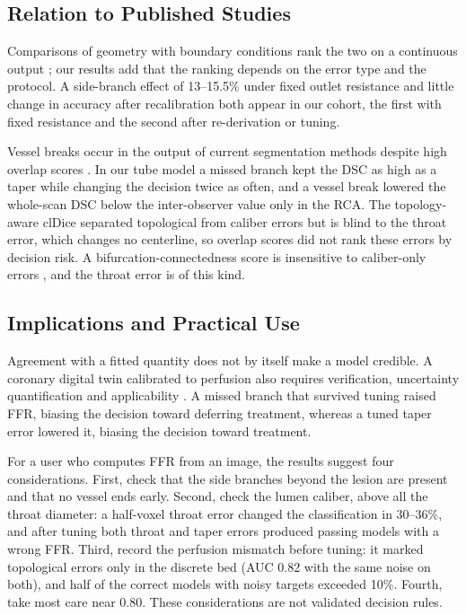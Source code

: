 \documentclass[journal,twoside,web]{ieeecolor}
\begin{document}
\subsection{Relation to Published Studies}
Comparisons of geometry with boundary conditions rank the two on a continuous output \cite{sankaran2016,tanade2022,korte2023};
our results add that the ranking depends on the error type and the protocol. A side-branch effect of 13--15.5\% under
fixed outlet resistance \cite{gamage2022} and little change in accuracy after recalibration \cite{gosling2020} both
appear in our cohort, the first with fixed resistance and the second after re-derivation or tuning.

Vessel breaks occur in the output of current segmentation methods despite high overlap scores \cite{bransby2026}.
In our tube model a missed branch kept the DSC as high as a taper while changing the decision twice as often, and a vessel break lowered the whole-scan DSC below the inter-observer value only in the RCA. The topology-aware clDice \cite{shit2021} separated topological from caliber errors but is blind to the throat error, which changes no centerline, so overlap scores did not rank these errors by decision risk. A bifurcation-connectedness score is insensitive to caliber-only errors \cite{owusu2026}, and the throat error is of this kind.

\subsection{Implications and Practical Use}
Agreement with a fitted quantity does not by itself make a model credible. A coronary digital twin calibrated to perfusion also requires verification,
uncertainty quantification and applicability \cite{viceconti2025}. A missed branch that survived tuning raised FFR, biasing the decision toward
deferring treatment, whereas a tuned taper error lowered it, biasing the decision toward treatment.

For a user who computes FFR from an image, the results suggest four considerations. First, check that the side branches beyond the lesion are present and that no vessel ends early.
Second, check the lumen caliber, above all the throat diameter: a half-voxel throat error changed the classification in 30--36\%, and after tuning both throat and taper errors produced passing models with a wrong FFR. Third, record the perfusion mismatch before tuning: it marked topological errors only in the discrete bed (AUC 0.82 with the same noise on both), and half of the correct models with noisy targets exceeded 10\%. Fourth, take most care near 0.80. These considerations are not validated decision rules.
\end{document}
